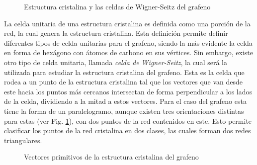\begin{figure}[!httb]
	\centering
	
	\caption{Estructura cristalina y las celdas de Wigner-Seitz del grafeno}
	\label{fig:wigner}
\end{figure}

\noindent La celda unitaria de una estructura cristalina es definida como una porción de la red, la cual genera la estructura cristalina. Esta definición permite definir diferentes tipos de celda unitarias para el grafeno, siendo la más evidente la celda en forma de hexágono con átomos de carbono en sus vértices. Sin embargo, existe otro tipo de celda unitaria, llamada \emph{celda de Wigner-Seitz}, la cual será la utilizada para estudiar la estructura cristalina del grafeno. Esta es la celda que rodea a un punto de la estructura cristalina tal que los vectores que van desde este hacia los puntos más cercanos intersectan de forma perpendicular a los lados de la celda, dividiendo a la mitad a estos vectores. Para el caso del grafeno esta tiene la forma de un paralelogramo, aunque existen tres orientaciones distintas para estas (ver Fig. \ref{fig:wigner}), con dos puntos de la red contenidos en este. Esto permite clasificar los puntos de la red cristalina en dos clases, las cuales forman dos redes triangulares.

\begin{figure}[!httb]
	\centering
	
	\caption{Vectores primitivos de la estructura cristalina del grafeno}
	\label{fig:crystalline}
\end{figure}

